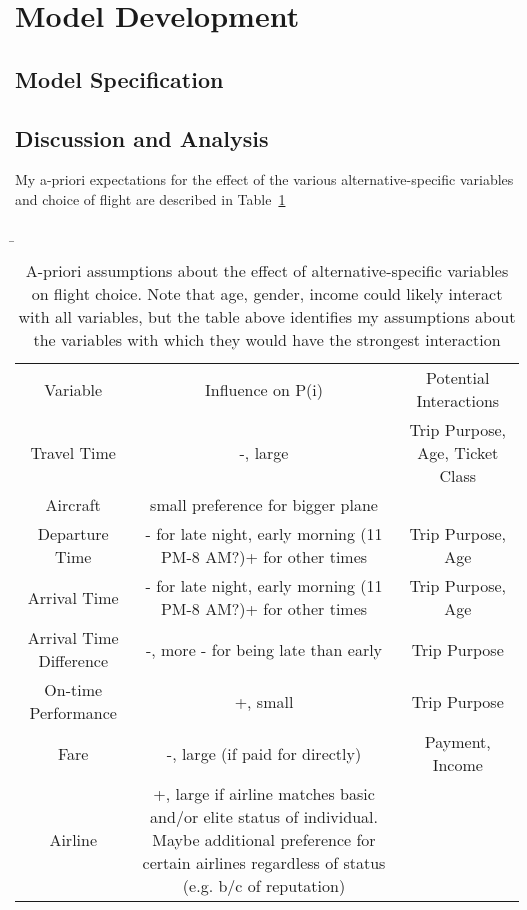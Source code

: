 \section{Model Development}
\subsection{Model Specification}
\subsection{Discussion and Analysis}
My a-priori expectations for the effect of the various alternative-specific variables and choice of flight are described in Table~\ref{tab:tab1}
\begin{table}
\label{tab:tab1}
    \b
    \begin{tabular}{ c c c }
        Variable & Influence on P(i) & Potential Interactions \\ 
        Travel Time & -, large & Trip Purpose, Age, Ticket Class \\ 
        Aircraft & small preference for bigger plane &  \\ 
        Departure Time & - for late night, early morning (11 PM-8 AM?)+ for other times & Trip Purpose, Age \\ 
        Arrival Time & - for late night, early morning (11 PM-8 AM?)+ for other times & Trip Purpose, Age \\ 
        Arrival Time Difference & -, more - for being late than early & Trip Purpose \\ 
        On-time Performance & +, small & Trip Purpose \\ 
        Fare & -, large (if paid for directly) & Payment, Income \\ 
        Airline & +, large if airline matches basic and/or elite status of individual. Maybe additional preference for certain airlines regardless of status (e.g. b/c of reputation) &  \\ 
    \end{tabular} 
    \caption{A-priori assumptions about the effect of alternative-specific variables on flight choice. Note that age, gender, income could likely interact with all variables, but the table above identifies my assumptions about the variables with which they would have the strongest interaction} 
\end{table}
